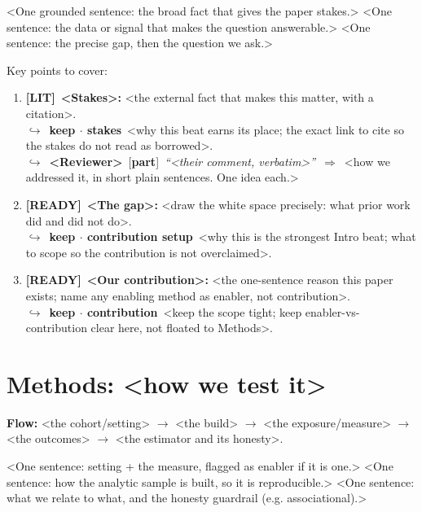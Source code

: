 \documentclass[11pt]{article}
\newcommand{\rdy}{\textcolor{cReady}{\textbf{[READY]}}}   %
\newcommand{\lit}{\textcolor{cLit}{\textbf{[LIT]}}}       %
\newcommand{\rev}[2]{\\{\footnotesize\color{gray}$\hookrightarrow$~\textbf{#1}~#2}}
\newcommand{\fb}[4]{\\{\footnotesize\color{cFb}$\hookrightarrow$~\textbf{#1}~[\textbf{#2}]~\emph{``#3''}~$\Rightarrow$~#4}}
\begin{document}
<One grounded sentence: the broad fact that gives the paper stakes.>
%
<One sentence: the data or signal that makes the question answerable.>
%
<One sentence: the precise gap, then the question we ask.>

Key points to cover:
\begin{enumerate}
\item \lit~\textbf{<Stakes>:} <the external fact that makes this matter, with a citation>. \rev{keep $\cdot$ stakes}{<why this beat earns its place; the exact link to cite so the stakes do not read as borrowed>.}
\fb{<Reviewer>}{part}{<their comment, verbatim>}{<how we addressed it, in short plain sentences. One idea each.>}
\item \rdy~\textbf{<The gap>:} <draw the white space precisely: what prior work did and did not do>. \rev{keep $\cdot$ contribution setup}{<why this is the strongest Intro beat; what to scope so the contribution is not overclaimed>.}
\item \rdy~\textbf{<Our contribution>:} <the one-sentence reason this paper exists; name any enabling method as enabler, not contribution>. \rev{keep $\cdot$ contribution}{<keep the scope tight; keep enabler-vs-contribution clear here, not floated to Methods>.}
\end{enumerate}

\section*{Methods: <how we test it>}

\noindent\textbf{Flow:} <the cohort/setting> $\rightarrow$ <the build> $\rightarrow$ <the exposure/measure> $\rightarrow$ <the outcomes> $\rightarrow$ <the estimator and its honesty>.

<One sentence: setting + the measure, flagged as enabler if it is one.>
%
<One sentence: how the analytic sample is built, so it is reproducible.>
%
<One sentence: what we relate to what, and the honesty guardrail (e.g. associational).>
\end{document}
